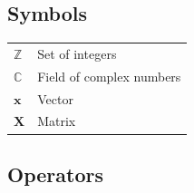 \documentclass[english,12pt,a4paper,pdftex,sci,utf8]{aaltothesis}
\begin{document}
\makecoverpage



\begin{abstractpage}[english]

\end{abstractpage}


\newpage







\thesistableofcontents



\subsection*{Symbols}

\begin{tabular}{ll}
$\mathbb{Z}$  & Set of integers \\
$\mathbb{C}$  & Field of complex numbers \\
$\mathbf{x}$  & Vector \\
$\mathbf{X}$  & Matrix \\
\end{tabular}

\subsection*{Operators}
\end{document}
